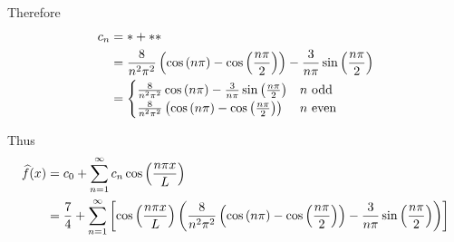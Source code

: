 Therefore 
\begin{align*}
    c_n
&= \ast + \ast\ast\\
&= \frac{8}{n^2 \pi^2} \pars{
        \cosp{\np} - \cosp{\npo2}
    } - \onp3 \sinp{\npo2}\\
    &= \begin{cases}
        \frac{8}{n^2 \pi^2} 
        \cosp{\np}
     - \onp3 \sinp{\npo2} &  n \text{ odd}\\
    \frac{8}{n^2 \pi^2} \pars{
        \cosp{\np} - \cosp{\npo2}
    } &  n \text{ even} 
    \end{cases}
\end{align*}

Thus
\begin{align*}
    \widehat{f}(x) &= c_0 + \sumn1 c_n \cosp{\npxl} \\
    &= \frac{7}{4} + \sumn{1} \brac{ \cosp{\npxl} 
        \pars{
            \frac{8}{n^2 \pi^2} \pars{
                \cosp{\np} - \cosp{\npo2}
            } - \onp3 \sinp{\npo2}
        }
    }
\end{align*}